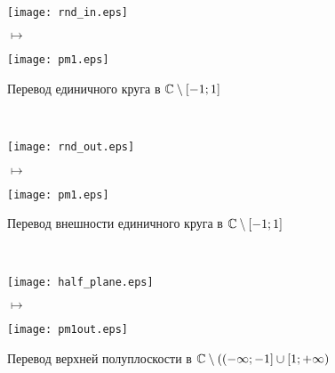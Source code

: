 \Example
~
\\
\begin{figure}[h!]
    \begin{minipage}[c]{0.45\textwidth}
        \centering
        \texttt{[image: rnd\_in.eps]}
    \end{minipage}
    \begin{minipage}[c]{0.1\textwidth}
        \centering
        \LARGE{$\mapsto$}
    \end{minipage}
    \begin{minipage}[c]{0.45\textwidth}
        \centering
        \texttt{[image: pm1.eps]}
    \end{minipage}
    \label{fig:24.10}
    \caption{Перевод единичного круга в $\mathbb{C} \setminus [-1;1]$}
\end{figure}
\FloatBarrier
\Example
~
\\
\begin{figure}[h!]
    \begin{minipage}[c]{0.45\textwidth}
        \centering
        \texttt{[image: rnd\_out.eps]}
    \end{minipage}
    \begin{minipage}[c]{0.1\textwidth}
        \centering
        \LARGE{$\mapsto$}
    \end{minipage}
    \begin{minipage}[c]{0.45\textwidth}
        \centering
        \texttt{[image: pm1.eps]}
    \end{minipage}
    \label{fig:24.11}
    \caption{Перевод внешности единичного круга в $\mathbb{C} \setminus [-1;1]$}
\end{figure}
\FloatBarrier
\Example
~
\\
\begin{figure}[h!]
    \begin{minipage}[c]{0.45\textwidth}
        \centering
        \texttt{[image: half\_plane.eps]}
    \end{minipage}
    \begin{minipage}[c]{0.1\textwidth}
        \centering
        \LARGE{$\mapsto$}
    \end{minipage}
    \begin{minipage}[c]{0.45\textwidth}
        \centering
        \texttt{[image: pm1out.eps]}
    \end{minipage}
    \label{fig:24.12}
    \caption{Перевод верхней полуплоскости в $\mathbb{C} \setminus ((-\infty;-1]\cup[1;+\infty)$}
\end{figure}
